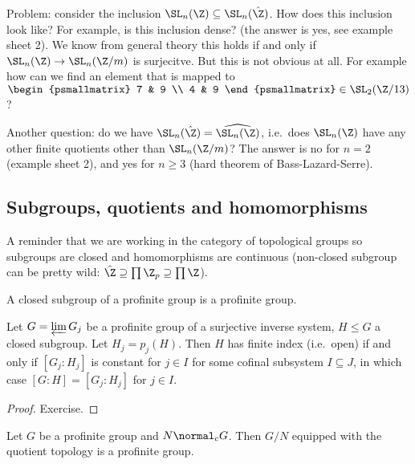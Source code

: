 \documentclass[a4paper]{article}
\begin{document}
Problem: consider the inclusion \(\SL_n(\Z) \subseteq \SL_n(\hat \Z)\). How does this inclusion look like? For example, is this inclusion dense? (the answer is yes, see example sheet 2). We know from general theory this holds if and only if \(\SL_n(\Z) \to \SL_n(\Z/m)\) is surjecitve. But this is not obvious at all. For example how can we find an element that is mapped to \(
\begin{psmallmatrix}
  7 & 9 \\
  4 & 9
\end{psmallmatrix}
\in \SL_2(\Z/13)\)?

Another question: do we have \(\SL_n(\hat \Z) = \widehat{\SL_n(\Z)}\), i.e.\ does \(\SL_n(\Z)\) have any other finite quotients other than \(\SL_n(\Z/m)\)? The answer is no for  \(n = 2\) (example sheet 2), and yes for \(n \geq 3\) (hard theorem of Bass-Lazard-Serre).

\subsection{Subgroups, quotients and homomorphisms}

A reminder that we are working in the category of topological groups so subgroups are closed and homomorphisms are continuous (non-closed subgroup can be pretty wild: \(\hat \Z \supseteq \prod \Z_p \supseteq \prod \Z\)).

\begin{proposition}
  A closed subgroup of a profinite group is a profinite group.
\end{proposition}

\begin{proposition}
  Let \(G = \varprojlim G_j\) be a profinite group of a surjective inverse system, \(H \leq G\) a closed subgroup. Let \(H_j = p_j(H)\). Then \(H\) has finite index (i.e.\ open) if and only if \([G_j: H_j]\) is constant for \(j \in I\) for some cofinal subsystem \(I \subseteq J\), in which case \([G: H] = [G_j: H_j]\) for \(j \in I\).
\end{proposition}

\begin{proof}
  Exercise.
\end{proof}

\begin{proposition}
  Let \(G\) be a profinite group and \(N \normal_c G\). Then \(G/N\) equipped with the quotient topology is a profinite group.
\end{proposition}
\end{document}
